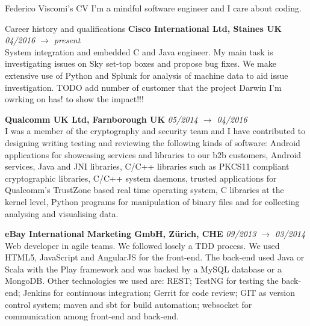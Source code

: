 \documentclass{resume}
\begin{document}
	\begin{rSection}{Federico Viscomi's CV}
		I'm a mindful software engineer and I care about coding.
	\end{rSection}
	\begin{rSection}{Career history and qualifications}
		{\bf Cisco International Ltd, Staines UK} \hfill {\em 04/2016 $\rightarrow$  present}\\
			System integration and embedded C and Java engineer. 
			My main task is investigating issues on Sky set-top boxes and propose bug fixes. 
			We make extensive use of Python and Splunk for analysis of machine data to aid issue investigation.
			TODO add number of customer that the project Darwin I'm owrking on has! to show the impact!!!

		{\bf Qualcomm UK Ltd, Farnborough UK} \hfill {\em 05/2014 $\rightarrow$ 04/2016}\\
			I was a member of the cryptography and security team and I have contributed to designing writing testing and reviewing the following kinds of software:
			Android applications for showcasing services and libraries to our b2b customers,
			Android services, 
			Java and JNI libraries, 
			C/C++ libraries such as PKCS11 compliant cryptographic libraries,
			C/C++ system daemons,
			trusted applications for Qualcomm's TrustZone based real time operating system,
			C libraries at the kernel level,
			Python programs for manipulation of binary files and for collecting analysing and visualising data.	

		{\bf eBay International Marketing GmbH, Z\"urich, CHE} \hfill {\em 09/2013 $\rightarrow$ 03/2014}\\
			Web developer in agile teams. 
			We followed losely a TDD process. 
			We used HTML5, JavaScript and AngularJS for the front-end. 
			The back-end used Java or Scala with the Play framework and was backed by a MySQL database or a MongoDB. 
			Other technologies we used are: 
			REST; TestNG for testing the back-end; 
			Jenkins for continuous integration; 
			Gerrit for code review; 
			GIT as version control system; 
			maven and sbt for build automation;
			websocket for communication among front-end and back-end.	  
	    

\end{rSection}
\end{document}
